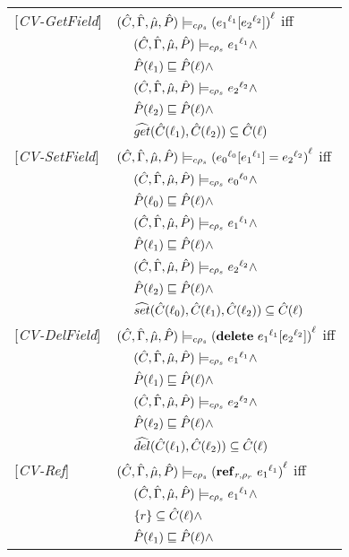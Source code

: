 \documentclass[[12pt,a4paper,twoside,openrigh]{report}
\begin{document}
\begin{tabular} {l l l l}
{[\textit{CV-GetField}]}&\multicolumn{3}{l}{$(\hat{C},\hat{\Gamma},\hat{\mu},\hat{P}) \models_{c \rho_s} {({e_1}^{\ell_1}[{e_2}^{\ell_2}])}^{\ell} $ iff}\\
&&\multicolumn{2}{l}{$ (\hat{C},\hat{\Gamma},\hat{\mu},\hat{P}) \models_{c \rho_s} {e_1}^{\ell_1} \wedge $}\\
&&\multicolumn{2}{l}{$\hat{P}(\ell_1) \sqsubseteq \hat{P}(\ell) \wedge$} \\
&&\multicolumn{2}{l}{$ (\hat{C},\hat{\Gamma},\hat{\mu},\hat{P}) \models_{c \rho_s} {e_2}^{\ell_2} \wedge $} \\
&&\multicolumn{2}{l}{$\hat{P}(\ell_2) \sqsubseteq \hat{P}(\ell) \wedge$} \\
&&\multicolumn{2}{l}{$\widehat{get} (\hat{C}(\ell_1), \hat{C}(\ell_2)) \subseteq \hat{C}(\ell)$} \\
{[\textit{CV-SetField}]}&\multicolumn{3}{l}{$(\hat{C},\hat{\Gamma},\hat{\mu},\hat{P}) \models_{c \rho_s} {({e_0}^{\ell_0}[{e_1}^{\ell_1}] = {e_2}^{\ell_2})}^{\ell} $ iff}\\
&&\multicolumn{2}{l}{$ (\hat{C},\hat{\Gamma},\hat{\mu},\hat{P}) \models_{c \rho_s} {e_0}^{\ell_0} \wedge $}\\
&&\multicolumn{2}{l}{$\hat{P}(\ell_0) \sqsubseteq \hat{P}(\ell) \wedge$} \\
&&\multicolumn{2}{l}{$ (\hat{C},\hat{\Gamma},\hat{\mu},\hat{P}) \models_{c \rho_s} {e_1}^{\ell_1} \wedge $} \\
&&\multicolumn{2}{l}{$\hat{P}(\ell_1) \sqsubseteq \hat{P}(\ell) \wedge$} \\
&&\multicolumn{2}{l}{$ (\hat{C},\hat{\Gamma},\hat{\mu},\hat{P}) \models_{c \rho_s} {e_2}^{\ell_2} \wedge $} \\
&&\multicolumn{2}{l}{$\hat{P}(\ell_2) \sqsubseteq \hat{P}(\ell) \wedge$} \\
&&\multicolumn{2}{l}{$\widehat{set} (\hat{C}(\ell_0), \hat{C}(\ell_1), \hat{C}(\ell_2)) \subseteq \hat{C}(\ell)$} \\
{[\textit{CV-DelField}]}&\multicolumn{3}{l}{$(\hat{C},\hat{\Gamma},\hat{\mu},\hat{P}) \models_{c \rho_s} {(\mathbf{delete}\ {e_1}^{\ell_1}[{e_2}^{\ell_2}])}^{\ell} $ iff}\\ 
&&\multicolumn{2}{l}{$ (\hat{C},\hat{\Gamma},\hat{\mu},\hat{P}) \models_{c \rho_s} {e_1}^{\ell_1} \wedge $}\\
&&\multicolumn{2}{l}{$\hat{P}(\ell_1) \sqsubseteq \hat{P}(\ell) \wedge$} \\
&&\multicolumn{2}{l}{$ (\hat{C},\hat{\Gamma},\hat{\mu},\hat{P}) \models_{c \rho_s} {e_2}^{\ell_2} \wedge $} \\
&&\multicolumn{2}{l}{$\hat{P}(\ell_2) \sqsubseteq \hat{P}(\ell) \wedge$} \\
&&\multicolumn{2}{l}{$\widehat{del} (\hat{C}(\ell_1), \hat{C}(\ell_2)) \subseteq \hat{C}(\ell)$}\\
{[\textit{CV-Ref}]}&\multicolumn{3}{l}{$ (\hat{C},\hat{\Gamma},\hat{\mu},\hat{P}) \models_{c \rho_s} {(\mathbf{ref}_{r,\rho_r}\ {e_1}^{\ell_1})}^{\ell} $ iff}\\
&&\multicolumn{2}{l}{$(\hat{C},\hat{\Gamma},\hat{\mu},\hat{P}) \models_{c \rho_s} {e_1}^{\ell_1} \wedge $}\\
&&\multicolumn{2}{l}{$\{r\} \subseteq \hat{C}(\ell) \wedge$}\\
&&\multicolumn{2}{l}{$\hat{P}(\ell_1) \sqsubseteq \hat{P}(\ell) \wedge$}\\

\end{tabular}
\end{document}
